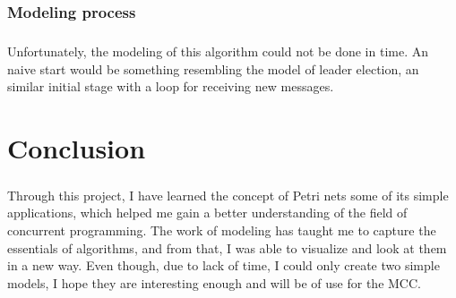 \documentclass{article}
\begin{document}
	\subsubsection{Modeling process}
	\subparagraph{}Unfortunately, the modeling of this algorithm could not be done in time. An naive start would be something resembling the model of leader election, an similar initial stage with a loop for receiving new messages.
	\section{Conclusion}
	\subparagraph{}Through this project, I have learned the concept of Petri nets some of its simple applications, which helped me gain a better understanding of the field of concurrent programming. The work of modeling has taught me to capture the essentials of algorithms, and from that, I was able to visualize and look at them in a new way. Even though, due to lack of time, I could only create two simple models, I hope they are interesting enough and will be of use for the MCC.


\end{document}
